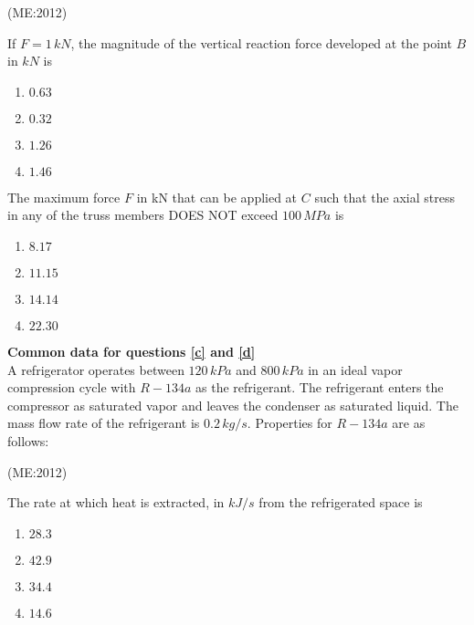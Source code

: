      \hfill{(ME:2012)}

        \item
		If $F = 1 \, kN$, the magnitude of the vertical reaction force developed at the point $B$ in $kN$ is
		\label{a}
		\begin{multicols}{4}
        \begin{enumerate}
            \item $0.63$
            \item $0.32$
            \item $1.26$
            \item $1.46$
        \end{enumerate}
		\end{multicols}
        \item
		The maximum force $F$ in kN that can be applied at $C$ such that the axial stress in any of the truss members DOES NOT exceed $100 \, MPa$ is
		\label{b}
		\begin{multicols}{4}
        \begin{enumerate}	
            \item $8.17$
            \item $11.15$
            \item $14.14$
            \item $22.30$
        \end{enumerate}
	\end{multicols}
\vspace{0.5cm}
     \textbf{Common data for questions \ref{c} and \ref{d}} \\ 
    A refrigerator operates between $120 \, kPa$ and $800 \, kPa$ in an ideal vapor compression cycle with $R-134a$ as the refrigerant. The refrigerant enters the compressor as saturated vapor and leaves the condenser as saturated liquid. The mass flow rate of the refrigerant is $0.2 \, kg/s$. Properties for $R-134a$ are as follows:
    \vspace{0.01cm}
    
    \vspace{0.1cm}
    

     \hfill{(ME:2012)}

        \item
		The rate at which heat is extracted, in $kJ/s$ from the refrigerated space is
		\label{c}
		\begin{multicols}{4}
        \begin{enumerate}
            \item $28.3$
            \item $42.9$
            \item $34.4$
            \item $14.6$
        \end{enumerate}
		\end{multicols}

